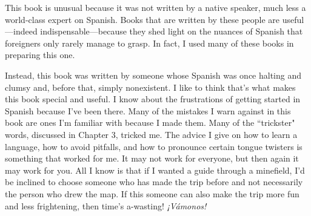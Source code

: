 This book is unusual because it was not written by a native
speaker, much less a world-class expert on Spanish. Books that are
written by these people are useful---indeed indispensable---because
they shed light on the nuances of Spanish that foreigners only rarely
manage to grasp. In fact, I used many of these books in preparing
this one.

Instead, this book was written by someone whose Spanish was
once halting and clumsy and, before that, simply nonexistent. I like to
think that's what makes this book special and useful. I know about the
frustrations of getting started in Spanish because I've been there. Many
of the mistakes I warn against in this book are ones I'm familiar with
because I made them. Many of the ``trickster" words, discussed in
Chapter 3, tricked me. The advice I give on how to learn a language,
how to avoid pitfalls, and how to pronounce certain tongue twisters
is something that worked for me. It may not work for everyone, but
then again it may work for you. All I know is that if I wanted a guide
through a minefield, I'd be inclined to choose someone who has made
the trip before and not necessarily the person who drew the map. If
this someone can also make the trip more fun and less frightening,
then time's a-wasting! \emph{¡Vámonos!}


